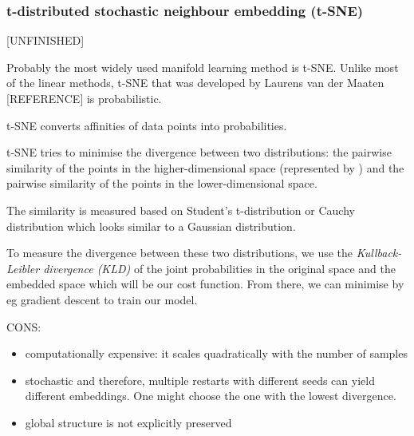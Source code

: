\hfill
\subsubsection{t-distributed stochastic neighbour embedding (t-SNE)}
[UNFINISHED]

Probably the most widely used manifold learning method is t-SNE.
Unlike most of the linear methods, t-SNE that was developed by Laurens van der Maaten [REFERENCE] is probabilistic.

t-SNE converts affinities of data points into probabilities. 

t-SNE tries  to minimise the divergence between two distributions: the pairwise similarity of the points in the higher-dimensional space (represented by ) and the pairwise similarity of the points in the lower-dimensional space.

The similarity is measured based on Student's t-distribution or Cauchy distribution which looks similar to a Gaussian distribution.


To measure the divergence between these two distributions, we use the \textit{Kullback-Leibler divergence (KLD)} of the joint probabilities in the original space and the embedded space which will be our cost function. From there, we can minimise by eg gradient descent to train our model.


CONS: 
\begin{itemize}
		\item computationally expensive: it scales quadratically with the number of samples
		\item stochastic and therefore, multiple restarts with different seeds can yield different embeddings. One might choose the one with the lowest divergence.
		\item global structure is not explicitly preserved
	\end{itemize}


